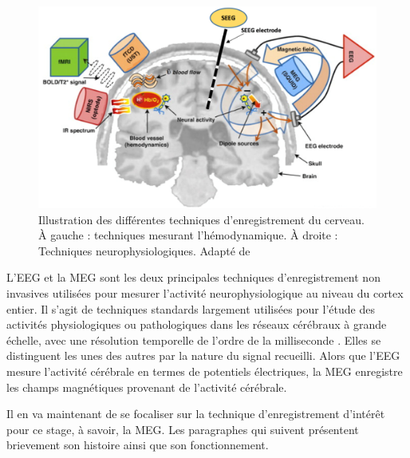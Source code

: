 \begin{figure}[!ht]
    \centering
    \includegraphics[width=12cm]{techniques_enregistrement.png}
    \caption{Illustration des différentes techniques d'enregistrement du cerveau. À gauche : techniques mesurant l'hémodynamique. À droite : Techniques neurophysiologiques. Adapté de \cite{12}}
    \label{fig1.2}
\end{figure}

\vspace{2ex}
L'EEG et la MEG sont les deux principales techniques d'enregistrement non invasives utilisées pour mesurer l'activité neurophysiologique au niveau du cortex entier. Il s'agit de techniques standards largement utilisées pour l'étude des activités physiologiques ou pathologiques dans les réseaux cérébraux à grande échelle, avec une résolution temporelle de l'ordre de la milliseconde \cite{9}. Elles se distinguent les unes des autres par la nature du signal recueilli. Alors que l'EEG mesure l'activité cérébrale en termes de potentiels électriques, la MEG enregistre les champs magnétiques provenant de l'activité cérébrale.

\vspace{2ex}
Il en va maintenant de se focaliser sur la technique d'enregistrement d'intérêt pour ce stage, à savoir, la MEG. Les paragraphes qui suivent présentent brievement son histoire ainsi que son fonctionnement.

